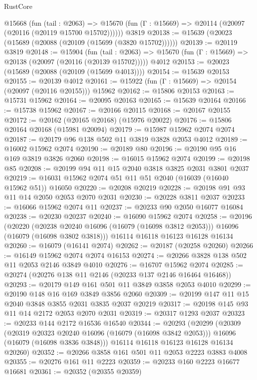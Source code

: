 \begin{lexlean}{RustCore}
\begin{coremodule}
    @15668
      (fun (tail : @2063) =>
      @15670 (fun (Γ : @15669) => @20114 (@20097 (@20116 (@20119 @15700 @15702))))))
    @3819
@20138 := @15639 (@20023 (@15689 (@20088 (@20109 (@15699 (@3820 @15702))))))
@20139 := @20119 @3819
@20148 := @15904
    (fun (tail : @2063) => @15670 (fun (Γ : @15669) => @20138 (@20097 (@20116 (@20139 @15702)))))
    @4012
@20153 := @20023 (@15689 (@20088 (@20109 (@15699 @4013))))
@20154 := @15639 @20153
@20155 := @20139 @4012
@20161 := @15922 (fun (Γ : @15669) => @20154 (@20097 (@20116 @20155))) @15962
@20162 := @15806 @20153
@20163 := @15731 @15962
@20164 := @20095 @20163
@20165 := @15639 @20164
@20166 := @15738 @15962
@20167 := @20166 @20115
@20168 := @20167 @20155
@20172 := @20162 (@20165 @20168) (@15976 @20022)
@20176 := @15806 @20164 @20168 (@15981 @20094)
@20179 := @15987 @15962 @2074 @2074
@20187 := @20179 @96 @138 @502 @11 @3819 @3828 @2053 @4012
@20189 := @16002 @15962 @2074
@20190 := @20189 @80
@20196 := @20190 @95 @16 @169 @3819 @3826 @2060
@20198 := @16015 @15962 @2074
@20199 := @20198 @85
@20208 := @20199 @94 @11 @15 @2040 @3818 @3825 @2031 @3801 @2037
@20219 := @16031 @15962 @2074 @51 @11 @51 @2040 (@16039 (@16040 @15962 @51)) @16050
@20220 := @20208 @20219
@20228 := @20198 @91 @93 @11 @14 @2050 @2053 @2070 @2031
@20230 := @20228 @3811 @2037
@20233 := @16066 @15962 @2074 @11
@20237 := @20233 @90 @2050 @16077 @16084
@20238 := @20230 @20237
@20240 := @16090 @15962 @2074
@20258 := @20196
    (@20220
      (@20238 @20240 @16096 (@16079 (@16098 @3812 @2053)))
      @16096
      (@16079 (@16098 @3802 @3818)))
    @16114
    @16118
    @16123
    @16128
    @16134
@20260 := @16079 (@16141 @2074)
@20262 := @20187 (@20258 @20260)
@20266 := @16149 @15962 @2074 @2074 @16153
@20274 := @20266 @3828 @138 @502 @11 @2053 @2146 @3849 @4010
@20276 := @16707 @15962 @2074
@20285 := @20274 (@20276 @138 @11 @2146 (@20233 @137 @2146 @16464 @16468))
@20293 := @20179 @149 @161 @501 @11 @3849 @3858 @2053 @4010
@20299 := @20190 @148 @16 @169 @3849 @3856 @2060
@20309 := @20199 @147 @11 @15 @2040 @3848 @3855 @2031 @3835 @2037 @20219
@20317 := @20198 @145 @93 @11 @14 @2172 @2053 @2070 @2031
@20319 := @20317 @1293 @2037
@20323 := @20233 @144 @2172 @16536 @16540
@20344 := @20293
    (@20299
      (@20309
        (@20319 @20323 @20240 @16096 (@16079 (@16098 @3842 @2053)))
        @16096
        (@16079 (@16098 @3836 @3848)))
      @16114
      @16118
      @16123
      @16128
      @16134
      @20260)
@20352 := @20266 @3858 @161 @501 @11 @2053 @2223 @3883 @4008
@20355 := @20276 @161 @11 @2223
@20359 := @20233 @160 @2223 @16677 @16681
@20361 := @20352 (@20355 @20359)

\end{coremodule}
\end{lexlean}
